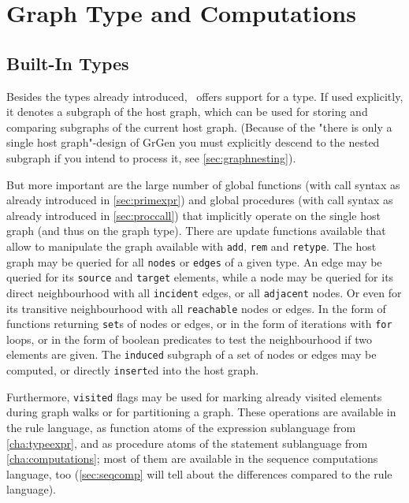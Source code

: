 \chapter{Graph Type and Computations}
\label{cha:graph}


\section{Built-In Types}
\label{sec:builtingenerictypes}
Besides the types already introduced, \GrG\ offers support for a \texttt{} type.
If used explicitly, it denotes a subgraph of the host graph, which can be used for storing and comparing subgraphs of the current host graph. (Because of the "there is only a single host graph"-design of GrGen you must explicitly descend to the nested subgraph if you intend to process it, see \ref{sec:graphnesting}).

But more important are the large number of global functions (with call syntax as already introduced in \ref{sec:primexpr}) and global procedures (with call syntax as already introduced in \ref{sec:proccall}) that implicitly operate on the single host graph (and thus on the graph type).
There are update functions available that allow to manipulate the graph available with \texttt{add}, \texttt{rem} and \texttt{retype}.
The host graph may be queried for all \texttt{nodes} or \texttt{edges} of a given type.
An edge may be queried for its \texttt{source} and \texttt{target} elements,
while a node may be queried for its direct neighbourhood with all \texttt{incident} edges, or all \texttt{adjacent} nodes.
Or even for its transitive neighbourhood with all \texttt{reachable} nodes or edges.
In the form of functions returning \texttt{set}s of nodes or edges, or in the form of iterations with \texttt{for} loops, or in the form of boolean predicates to test the neighbourhood if two elements are given.
The \texttt{induced} subgraph of a set of nodes or edges may be computed, or directly \texttt{insert}ed into the host graph.

Furthermore, \texttt{visited} flags may be used for marking already visited elements during graph walks or for partitioning a graph.
These operations are available in the rule language, as function atoms of the expression sublanguage from \ref{cha:typeexpr}, and as procedure atoms of the statement sublanguage from \ref{cha:computations}; 
most of them are available in the sequence computations language, too
(\ref{sec:seqcomp} will tell about the differences compared to the rule language).


